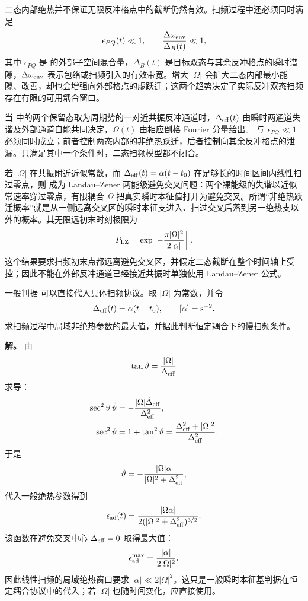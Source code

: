 二态内部绝热并不保证无限反冲格点中的截断仍然有效。扫频过程中还必须同时满足
\begin{equation*}
 \epsilon_{PQ}(t)\ll1,
 \qquad
 \frac{\Delta\omega_{\rm env}}{\Delta_B(t)}\ll1,
\end{equation*}
其中 $\epsilon_{PQ}$ 是 的外部子空间混合量，$\Delta_B(t)$ 是目标双态与其余反冲格点的瞬时谱隙，$\Delta\omega_{\rm env}$ 表示包络或扫频引入的有效带宽。增大 $|\Omega|$ 会扩大二态内部最小能隙、改善，却也会增强向外部格点的虚跃迁；这两个趋势决定了实际反冲双态扫频存在有限的可用耦合窗口。

当 中的两个保留态取为周期势的一对近共振反冲通道时，$\Delta_{\rm eff}(t)$ 由瞬时两通道失谐及外部通道自能共同决定，$\Omega(t)$ 由相应倒格 Fourier 分量给出。 与 $\epsilon_{PQ}\ll1$ 必须同时成立；前者控制两态内部的非绝热跃迁，后者控制向其余反冲格点的泄漏。只满足其中一个条件时，二态扫频模型都不闭合。

若 $|\Omega|$ 在共振附近近似常数，而 $\Delta_{\rm eff}(t)=\alpha(t-t_0)$ 在足够长的时间区间内线性扫过零点，则 成为 Landau--Zener 两能级避免交叉问题：两个裸能级的失谐以近似常速率穿过零点，有限耦合 $\Omega$ 把真实瞬时本征值打开为避免交叉。所谓“非绝热跃迁概率”就是从一侧远离交叉区的瞬时本征支进入、扫过交叉后落到另一绝热支以外的概率。其无限远初末时刻极限为
\begin{equation*}
 P_{\rm LZ}=\exp\!\left[-\frac{\pi|\Omega|^2}{2|\alpha|}\right].
\end{equation*}
这个结果要求扫频初末点都远离避免交叉区，并假定二态截断在整个时间轴上受控；因此不能在外部反冲通道已经接近共振时单独使用 Landau--Zener 公式。

\begin{exbox}[恒定耦合线性扫频]
一般判据 可以直接代入具体扫频协议。取 $|\Omega|$ 为常数，并令
\[
\Delta_{\rm eff}(t)=\alpha(t-t_0),
\qquad [\alpha]={\rm s^{-2}}.
\]
求扫频过程中局域非绝热参数的最大值，并据此判断恒定耦合下的慢扫频条件。

\textbf{解。} 由
\[
\tan\vartheta=\frac{|\Omega|}{\Delta_{\rm eff}}
\]
求导：
\begin{align*}
\sec^2\vartheta\,\dot\vartheta
&=-\frac{|\Omega|\dot\Delta_{\rm eff}}{\Delta_{\rm eff}^2},\\
\sec^2\vartheta
&=1+\tan^2\vartheta
=\frac{\Delta_{\rm eff}^2+|\Omega|^2}{\Delta_{\rm eff}^2}.
\end{align*}
于是
\[
\dot\vartheta
=-\frac{|\Omega|\alpha}{|\Omega|^2+\Delta_{\rm eff}^2},
\]
代入一般绝热参数得到
\[
\epsilon_{\rm ad}(t)
=\frac{|\Omega\alpha|}
{2(|\Omega|^2+\Delta_{\rm eff}^2)^{3/2}}.
\]
该函数在避免交叉中心 $\Delta_{\rm eff}=0$ 取得最大值：
\[
\epsilon_{\rm ad}^{\max}
=\frac{|\alpha|}{2|\Omega|^2}.
\]
因此线性扫频的局域绝热窗口要求 $|\alpha|\ll2|\Omega|^2$。这只是一般瞬时本征基判据在恒定耦合协议中的代入；若 $|\Omega|$ 也随时间变化，应直接使用。
\end{exbox}


